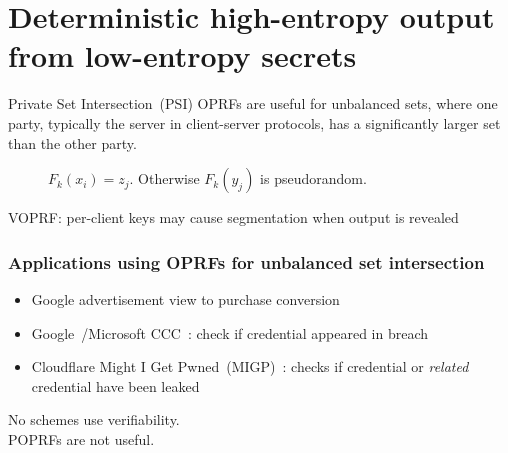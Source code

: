 \documentclass[10pt]{beamer}
\begin{document}
\section{Deterministic high-entropy output from low-entropy secrets}

\begin{frame}{Private Set Intersection~(PSI)}
  OPRFs are useful for \alert{unbalanced} sets, where one party, typically the
  server in client-server protocols, has a significantly larger set than the
  other party.\pause
  \begin{figure}
    \centering
    \(F_{k}(x_i) = z_{j}\).
    Otherwise \(F_{k}(y_j)\) is pseudorandom.
  \end{figure}\pause
  \hspace*{\fill} \alert{VOPRF: per-client keys may cause segmentation when
  output is revealed}
\end{frame}
\begin{frame}
  \frametitle{Applications using OPRFs for unbalanced set intersection}
  \begin{itemize}
    \item Google advertisement view to purchase conversion~\cite{EUROSP:IKNPSSRSY20} \pause
    \item Google~\cite{USENIX:TPYRKI19}/Microsoft CCC~\cite{microsoft-ccc}: check if credential appeared in breach\pause
    \item Cloudflare Might I Get Pwned~(MIGP)~\cite{ppccc-cloudflare}: checks if credential or
      \emph{related} credential have been leaked\pause
  \end{itemize}
  \alert{No schemes use verifiability. }\pause \\ 
  POPRFs are not useful. 
\end{frame}
\end{document}
